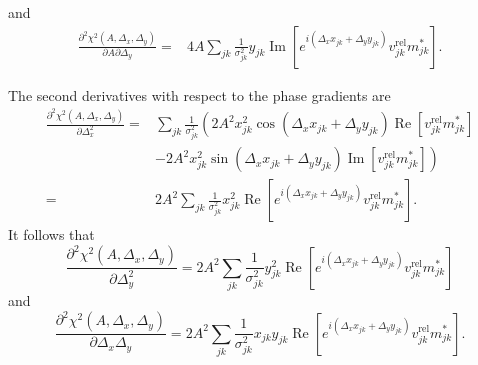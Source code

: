 \documentclass{article}
\newcommand\re{\operatorname{Re}}
\newcommand\im{\operatorname{Im}}
\begin{document}
and
\begin{equation}
\begin{split}
    \frac{\partial^2 \chi^2(A, \Delta_x, \Delta_y)}{\partial A \partial \Delta_y} =& 4A \sum_{jk} \frac{1}{\sigma_{jk}^2} y_{jk} \im[e^{i(\Delta_x x_{jk} + \Delta_y y_{jk})} v^\text{rel}_{jk} m^*_{jk}].
\end{split}
\end{equation}

The second derivatives with respect to the phase gradients are
\begin{equation}
\begin{split}
    \frac{\partial^2 \chi^2(A, \Delta_x, \Delta_y)}{\partial \Delta_x^2} =& \sum_{jk} \frac{1}{\sigma_{jk}^2} \left( 2 A^2 x^2_{jk} \cos(\Delta_x x_{jk} + \Delta_y y_{jk}) \re[v^\text{rel}_{jk} m^*_{jk}] \right. \\
    &- \left. 2 A^2 x^2_{jk} \sin(\Delta_x x_{jk} + \Delta_y y_{jk}) \im[v^\text{rel}_{jk} m^*_{jk}] \right) \\
    =& 2A^2 \sum_{jk} \frac{1}{\sigma_{jk}^2} x^2_{jk} \re[e^{i(\Delta_x x_{jk} + \Delta_y y_{jk})} v^\text{rel}_{jk} m^*_{jk}].
\end{split}
\end{equation}
It follows that
\begin{equation}
    \frac{\partial^2 \chi^2(A, \Delta_x, \Delta_y)}{\partial \Delta_y^2} = 2A^2 \sum_{jk} \frac{1}{\sigma_{jk}^2} y^2_{jk} \re[e^{i(\Delta_x x_{jk} + \Delta_y y_{jk})} v^\text{rel}_{jk} m^*_{jk}]
\end{equation}
and
\begin{equation}
    \frac{\partial^2 \chi^2(A, \Delta_x, \Delta_y)}{\partial \Delta_x \Delta_y} = 2A^2 \sum_{jk} \frac{1}{\sigma_{jk}^2} x_{jk} y_{jk} \re[e^{i(\Delta_x x_{jk} + \Delta_y y_{jk})} v^\text{rel}_{jk} m^*_{jk}].
\end{equation}
\end{document}
